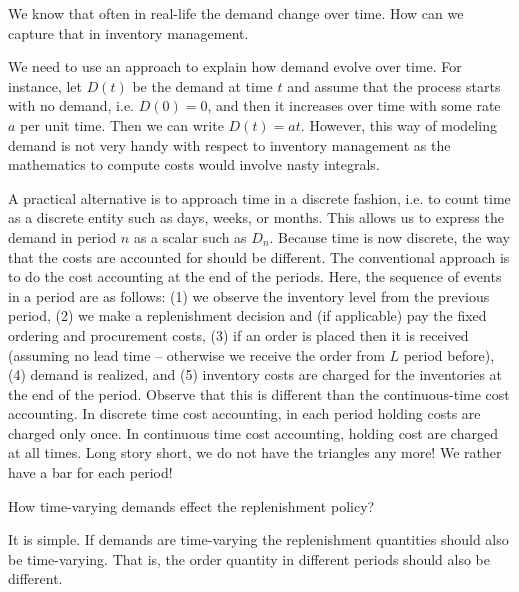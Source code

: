 \begin{question}
We know that often in real-life the demand change over time. How can we capture that in inventory management.
\end{question}

\begin{solution}
We need to use an approach to explain how demand evolve over time. For instance, let $D(t)$ be the demand at time $t$ and assume that the process starts with no demand, i.e. $D(0)=0$, and then it increases over time with some rate $a$ per unit time. Then we can write $D(t)=at$. However, this way of modeling demand is not very handy with respect to inventory management as the mathematics to compute costs would involve nasty integrals. 

A practical alternative is to approach time in a discrete fashion, i.e. to count time as a discrete entity such as days, weeks, or months. This allows us to express the demand in period $n$ as a scalar such as $D_n$. Because time is now discrete, the way that the costs are accounted for should be different. The conventional approach is to do the cost accounting at the end of the periods. Here, the sequence of events in a period are as follows: (1) we observe the inventory level from the previous period, (2) we make a replenishment decision and (if applicable) pay the fixed ordering and procurement costs, (3) if an order is placed then it is received (assuming no lead time -- otherwise we receive the order from $L$ period before), (4) demand is realized, and (5) inventory costs are charged for the inventories at the end of the period. Observe that this is different than the continuous-time cost accounting. In discrete time cost accounting, in each period holding costs are charged only once. In continuous time cost accounting, holding cost are charged at all times. Long story short, we do not have the triangles any more! We rather have a bar for each period! 
\end{solution}

\begin{question}
How time-varying demands effect the replenishment policy?
\end{question}

\begin{solution}
It is simple. If demands are time-varying the replenishment quantities should also be time-varying. That is, the order quantity in different periods should also be different. 
\end{solution}

